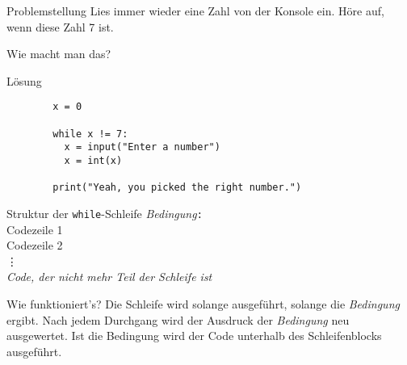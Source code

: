 \begin{frame}
\begin{block}{Problemstellung}
	\vspace{2pt}
	Lies immer wieder eine Zahl von der Konsole ein. Höre auf, wenn diese Zahl 7 ist. 
	
	Wie macht man das? 
\end{block}
\end{frame}

\begin{fragile}
	
\begin{block}{Lösung}
		\vspace{2pt}
		
	\begin{verbatim}
		x = 0
		
		while x != 7: 
		  x = input("Enter a number")
		  x = int(x)
		  
		print("Yeah, you picked the right number.")
	\end{verbatim}
	
\end{block}
\end{fragile}


\begin{frame}

\renewcommand{\baselinestretch}{1.5}
\begin{block}{Struktur der \texttt{while}-Schleife}
	\vspace{2pt}
	\pause {} \pause \textit{Bedingung}\pause\texttt{:} \pause \\
	\spacechar\spacechar Codezeile 1 \pause \\ 
	\spacechar\spacechar Codezeile 2 \pause \\
	\spacechar\spacechar \phantom{Code} \vdots \pause  \\
	\textit{Code, der nicht mehr Teil der Schleife ist}
\end{block}
\vspace{12pt}
\pause 
{}
\renewcommand{\baselinestretch}{1}
\begin{block}{Wie funktioniert's?}
	\vspace{2pt}
	Die Schleife wird solange ausgeführt, solange die \emph{Bedingung}  ergibt. Nach jedem Durchgang wird der Ausdruck der \emph{Bedingung} neu ausgewertet. 
	Ist die Bedingung  wird der Code unterhalb des Schleifenblocks ausgeführt. 
\end{block}

\end{frame}

